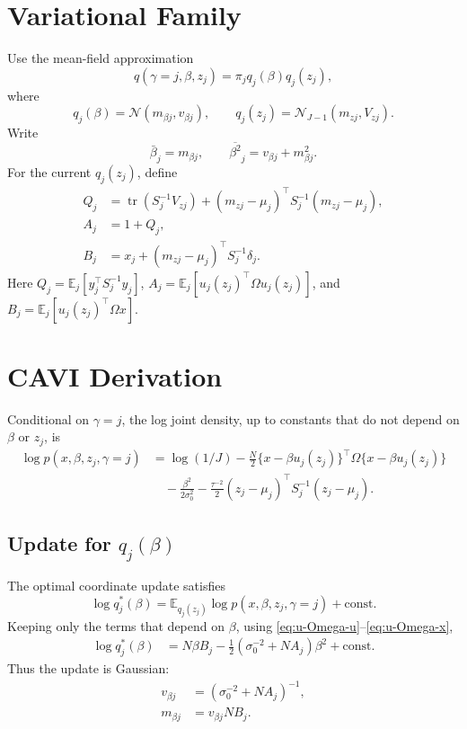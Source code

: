 \documentclass[11pt]{article}
\newcommand{\Om}{\Omega}
\newcommand{\E}{\mathbb E}
\newcommand{\tr}{\operatorname{tr}}
\newcommand{\Normal}{\mathcal N}
\begin{document}
\section{Variational Family}

Use the mean-field approximation
\[
q(\gamma=j,\beta,z_j)=\pi_jq_j(\beta)q_j(z_j),
\]
where
\[
q_j(\beta)=\Normal(m_{\beta j},v_{\beta j}),
\qquad
q_j(z_j)=\Normal_{J-1}(m_{zj},V_{zj}).
\]
Write
\[
\bar\beta_j=m_{\beta j},
\qquad
\overline{\beta^2}_j=v_{\beta j}+m_{\beta j}^2.
\]
For the current \(q_j(z_j)\), define
\begin{align}
Q_j
&=
\tr(S_j^{-1}V_{zj})
+(m_{zj}-\mu_j)^\top S_j^{-1}(m_{zj}-\mu_j),\\
A_j&=1+Q_j,\\
B_j
&=
x_j+(m_{zj}-\mu_j)^\top S_j^{-1}\delta_j.
\end{align}
Here \(Q_j=\E_j[y_j^\top S_j^{-1}y_j]\),
\(A_j=\E_j[u_j(z_j)^\top\Om u_j(z_j)]\), and
\(B_j=\E_j[u_j(z_j)^\top\Om x]\).

\section{CAVI Derivation}

Conditional on \(\gamma=j\), the log joint density, up to constants that
do not depend on \(\beta\) or \(z_j\), is
\begin{align}
\log p(x,\beta,z_j,\gamma=j)
&=
\log(1/J)
-\frac{N}{2}\{x-\beta u_j(z_j)\}^\top
\Om
\{x-\beta u_j(z_j)\} \nonumber\\
&\quad
-\frac{\beta^2}{2\sigma_0^2}
-\frac{\tau^{-2}}{2}(z_j-\mu_j)^\top S_j^{-1}(z_j-\mu_j).
\label{eq:log-joint}
\end{align}

\subsection{Update for \texorpdfstring{\(q_j(\beta)\)}{qj(beta)}}

The optimal coordinate update satisfies
\[
\log q_j^*(\beta)
=
\E_{q_j(z_j)}\log p(x,\beta,z_j,\gamma=j)+\mathrm{const}.
\]
Keeping only the terms that depend on \(\beta\), using
\eqref{eq:u-Omega-u}--\eqref{eq:u-Omega-x},
\begin{align}
\log q_j^*(\beta)
&=
N\beta B_j
-\frac12\left(\sigma_0^{-2}+NA_j\right)\beta^2
+\mathrm{const}.
\end{align}
Thus the update is Gaussian:
\begin{align}
v_{\beta j}
&=
\left(\sigma_0^{-2}+NA_j\right)^{-1},\\
m_{\beta j}
&=
v_{\beta j}NB_j.
\end{align}
\end{document}
